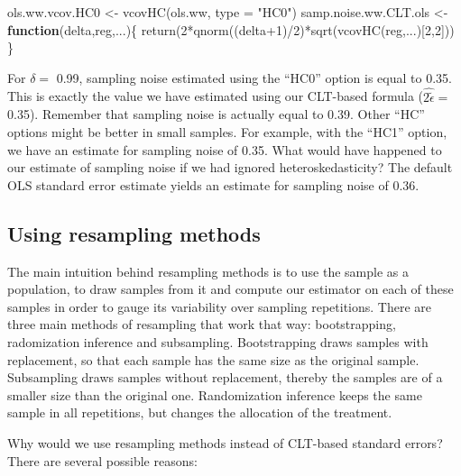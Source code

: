 \documentclass[
]{book}
\newenvironment{Shaded}{\begin{snugshade}}{\end{snugshade}}
\newcommand{\AttributeTok}[1]{\textcolor[rgb]{0.77,0.63,0.00}{#1}}
\newcommand{\ControlFlowTok}[1]{\textcolor[rgb]{0.13,0.29,0.53}{\textbf{#1}}}
\newcommand{\DecValTok}[1]{\textcolor[rgb]{0.00,0.00,0.81}{#1}}
\newcommand{\FunctionTok}[1]{\textcolor[rgb]{0.00,0.00,0.00}{#1}}
\newcommand{\NormalTok}[1]{#1}
\newcommand{\OtherTok}[1]{\textcolor[rgb]{0.56,0.35,0.01}{#1}}
\newcommand{\SpecialCharTok}[1]{\textcolor[rgb]{0.00,0.00,0.00}{#1}}
\newcommand{\StringTok}[1]{\textcolor[rgb]{0.31,0.60,0.02}{#1}}
\theoremstyle{definition}
\theoremstyle{definition}
\theoremstyle{definition}
\theoremstyle{definition}
\theoremstyle{remark}
\begin{document}
\begin{Shaded}
\begin{Highlighting}[]
\NormalTok{ols.ww.vcov.HC0 }\OtherTok{\textless{}{-}} \FunctionTok{vcovHC}\NormalTok{(ols.ww, }\AttributeTok{type =} \StringTok{"HC0"}\NormalTok{)}
\NormalTok{samp.noise.ww.CLT.ols }\OtherTok{\textless{}{-}} \ControlFlowTok{function}\NormalTok{(delta,reg,...)\{}
  \FunctionTok{return}\NormalTok{(}\DecValTok{2}\SpecialCharTok{*}\FunctionTok{qnorm}\NormalTok{((delta}\SpecialCharTok{+}\DecValTok{1}\NormalTok{)}\SpecialCharTok{/}\DecValTok{2}\NormalTok{)}\SpecialCharTok{*}\FunctionTok{sqrt}\NormalTok{(}\FunctionTok{vcovHC}\NormalTok{(reg,...)[}\DecValTok{2}\NormalTok{,}\DecValTok{2}\NormalTok{]))}
\NormalTok{\}}
\end{Highlighting}
\end{Shaded}

For \(\delta=\) 0.99, sampling noise estimated using the ``HC0'' option is equal to 0.35.
This is exactly the value we have estimated using our CLT-based formula (\(\hat{2\tilde{\epsilon}}=\) 0.35).
Remember that sampling noise is actually equal to 0.39.
Other ``HC'' options might be better in small samples.
For example, with the ``HC1'' option, we have an estimate for sampling noise of 0.35.
What would have happened to our estimate of sampling noise if we had ignored heteroskedasticity?
The default OLS standard error estimate yields an estimate for sampling noise of 0.36.

\hypertarget{sec:resamp}{%
\subsection{Using resampling methods}\label{sec:resamp}}

The main intuition behind resampling methods is to use the sample as a population, to draw samples from it and compute our estimator on each of these samples in order to gauge its variability over sampling repetitions.
There are three main methods of resampling that work that way: bootstrapping, radomization inference and subsampling.
Bootstrapping draws samples with replacement, so that each sample has the same size as the original sample.
Subsampling draws samples without replacement, thereby the samples are of a smaller size than the original one.
Randomization inference keeps the same sample in all repetitions, but changes the allocation of the treatment.

Why would we use resampling methods instead of CLT-based standard errors?
There are several possible reasons:
\end{document}
